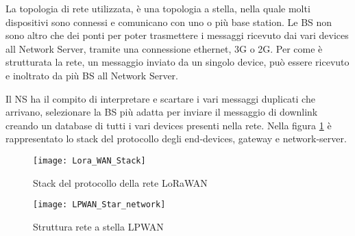 La topologia di rete utilizzata, è una topologia a stella, nella quale molti
dispositivi sono connessi e comunicano con uno o più base station. Le BS non
sono altro che dei ponti per poter trasmettere i messaggi ricevuto dai vari
devices all Network Server, tramite una connessione ethernet, 3G o 2G. 
Per come è strutturata la rete, un messaggio inviato
da un singolo device, può essere ricevuto e inoltrato da più BS all Network
Server.

Il NS ha il compito di interpretare e scartare i vari messaggi duplicati che
arrivano, selezionare la BS più adatta per inviare il messaggio di downlink
creando un database di tutti i vari devices presenti nella rete. Nella figura
\ref{fig:stack_lora} è rappresentato lo stack del protocollo degli end-devices,
gateway  e network-server. 

\begin{figure}[h]
\centering 
\texttt{[image: Lora\_WAN\_Stack]}
\caption{Stack del protocollo della rete LoRaWAN}
\label{fig:stack_lora}
\end{figure}

\begin{figure}[h]
\centering 
\texttt{[image: LPWAN\_Star\_network]}
\caption{Struttura rete a stella LPWAN}
\end{figure}

